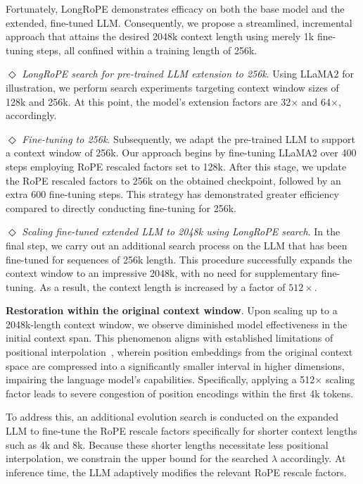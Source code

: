 Fortunately, LongRoPE demonstrates efficacy on both the base model and the extended, fine-tuned LLM. Consequently, we propose a streamlined, incremental approach that attains the desired 2048k context length using merely 1k fine-tuning steps, all confined within a training length of 256k.

$\Diamond$ \textit{LongRoPE search for pre-trained LLM extension to 256k}. Using LLaMA2 for illustration, we perform search experiments targeting context window sizes of 128k and 256k. At this point, the model's extension factors are 32$\times$ and 64$\times$, accordingly.

$\Diamond$ \textit{Fine-tuning to 256k}. Subsequently, we adapt the pre-trained LLM to support a context window of 256k. Our approach begins by fine-tuning LLaMA2 over 400 steps employing RoPE rescaled factors set to 128k. After this stage, we update the RoPE rescaled factors to 256k on the obtained checkpoint, followed by an extra 600 fine-tuning steps. This strategy has demonstrated greater efficiency compared to directly conducting fine-tuning for 256k.

$\Diamond$ \textit{Scaling fine-tuned extended LLM to 2048k using LongRoPE search}. In the final step, we carry out an additional search process on the LLM that has been fine-tuned for sequences of 256k length. This procedure successfully expands the context window to an impressive 2048k, with no need for supplementary fine-tuning. As a result, the context length is increased by a factor of $512\times$.

\textbf{Restoration within the original context window}. Upon scaling up to a 2048k-length context window, we observe diminished model effectiveness in the initial context span. This phenomenon aligns with established limitations of positional interpolation~\cite{pi}, wherein position embeddings from the original context space are compressed into a significantly smaller interval in higher dimensions, impairing the language model's capabilities. Specifically, applying a 512$\times$ scaling factor leads to severe congestion of position encodings within the first 4k tokens.

To address this, an additional evolution search is conducted on the expanded LLM to fine-tune the RoPE rescale factors specifically for shorter context lengths such as 4k and 8k. Because these shorter lengths necessitate less positional interpolation, we constrain the upper bound for the searched $\lambda$ accordingly. At inference time, the LLM adaptively modifies the relevant RoPE rescale factors.

